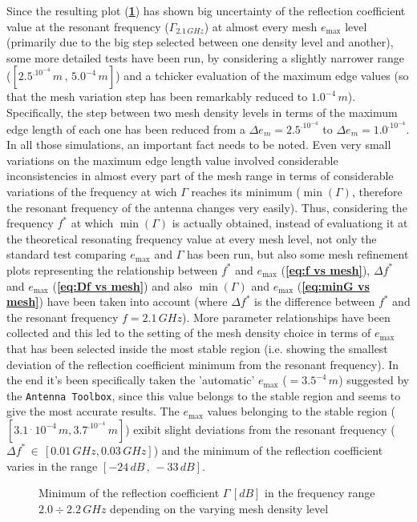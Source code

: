 \documentclass[12pt,a4paper,twocolumn]{article}
\begin{document}
{Since the resulting plot  (\textbf{\cref{fig:first mesh test}}) has shown big uncertainty of the reflection coefficient value at the resonant frequency ($\Gamma_{2.1\,GHz}$) at almost every mesh $e_{\max}$ level (primarily due to the big step selected between one density level and another), some more detailed tests have been run, by considering a slightly narrower range ($[2.5^.10^{-4}\,m\,,\,5.0^{-4}\,m]$) and a tchicker evaluation of the maximum edge values (so that the mesh variation step has been remarkably reduced to $1.0^{-4}\,m$). Specifically, the step between two mesh density levels in terms of the maximum edge length of each one has been reduced from a $\Delta e_m=2.5^.10^{-4}$ to $\Delta e_m=1.0^.10^{-4}$. In all those simulations, an important fact needs to be noted. Even very small variations on the maximum edge length value involved considerable inconsistencies in almost every part of the mesh range in terms of considerable variations of the frequency at wich $\Gamma$ reaches its minimum ($\min(\Gamma)$, therefore the resonant frequency of the antenna changes very easily).  
Thus, considering the frequency $f^*$ at which $\min(\Gamma)$ is actually obtained, instead of evaluationg it at the theoretical resonating frequency value at every mesh level, not only the standard test comparing $e_{\max}$ and $\Gamma$ has been run, but also some mesh refinement plots representing the relationship between $f^*$ and $e_{\max}$ (\textbf{\cref{eq:f vs mesh}}), $\Delta f^*$ and $e_{\max}$ (\textbf{\cref{eq:Df vs mesh}}) and also $\min(\Gamma)$ and $e_{\max}$ (\textbf{\cref{eq:minG vs mesh}}) have been taken into account (where $\Delta f^*$ is the difference between $f^*$ and the resonant frequency $f=2.1\,GHz$). More parameter relationships have been collected and this led to the setting of the mesh density choice in terms of $e_{\max}$ that has been selected inside the most stable region (i.e. showing the smallest deviation of the reflection coefficient minimum from the resonant frequency). In the end it's been specifically taken the 'automatic' $e_{\max}$ ($=3.5^{-4}\,m$) suggested by the \texttt{\color{Mahogany}Antenna Toolbox}, since this value  belongs to the stable region and seems to give the most accurate results. The $e_{\max}$ values belonging to the stable region ($[3.1\,^.\,10^{-4}\,m,3.7^.10^{-4}\,m]$) exibit slight deviations from the resonant frequency ($\Delta f^*\,\in\,[0.01\,GHz,0.03\,GHz]$) and the minimum of the reflection coefficient varies in the range $[-24\,dB\,,\,-33\,dB]$. 
\begin{figure}[bt!]
	\def\svgwidth{\linewidth}
	\tiny{}
	\hfill
	\caption{{Minimum of the reflection coefficient $\Gamma\, [dB]$ in the frequency range $2.0\div 2.2\,GHz$ depending on the varying mesh density level}}
	\label{fig:first mesh test}
\end{figure}

}
\end{document}

